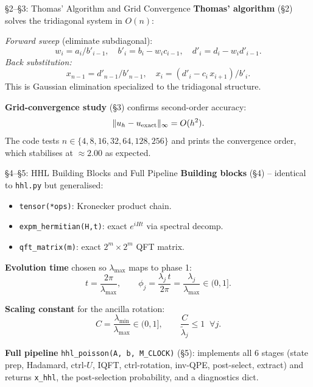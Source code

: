 \documentclass{beamer}
\begin{document}

\begin{frame}{\S2--\S3: Thomas' Algorithm and Grid Convergence}
\textbf{Thomas' algorithm} (\S2) solves the tridiagonal system in $O(n)$:

\medskip
\textit{Forward sweep} (eliminate subdiagonal):
\[
  w_i = a_i / b'_{i-1},\quad
  b'_i = b_i - w_i c_{i-1},\quad
  d'_i = d_i - w_i d'_{i-1}.
\]
\textit{Back substitution:}
\[
  x_{n-1} = d'_{n-1}/b'_{n-1},\quad
  x_i = (d'_i - c_i\,x_{i+1})/b'_i.
\]
This is Gaussian elimination specialized to the tridiagonal structure.

\medskip
\textbf{Grid-convergence study} (\S3) confirms second-order accuracy:
\[
  \|u_h - u_{\rm exact}\|_\infty = O(h^2).
\]
The code tests $n \in \{4,8,16,32,64,128,256\}$ and prints the
convergence order, which stabilises at $\approx 2.00$ as expected.
\end{frame}


\begin{frame}{\S4--\S5: HHL Building Blocks and Full Pipeline}
\textbf{Building blocks} (\S4) -- identical to \texttt{hhl.py} but generalised:
\begin{itemize}
  \item \texttt{tensor(*ops)}: Kronecker product chain.
  \item \texttt{expm\_hermitian(H,t)}: exact $e^{iHt}$ via spectral decomp.
  \item \texttt{qft\_matrix(m)}: exact $2^m\times 2^m$ QFT matrix.
\end{itemize}

\textbf{Evolution time} chosen so $\lambda_{\max}$ maps to phase 1:
\[
  t = \frac{2\pi}{\lambda_{\max}},
  \qquad
  \phi_j = \frac{\lambda_j\,t}{2\pi} = \frac{\lambda_j}{\lambda_{\max}} \in (0,1].
\]

\textbf{Scaling constant} for the ancilla rotation:
\[
  C = \frac{\lambda_{\min}}{\lambda_{\max}} \in (0,1],
  \qquad
  \frac{C}{\widetilde{\lambda}_j} \le 1 \;\;\forall j.
\]

\medskip
\textbf{Full pipeline} \texttt{hhl\_poisson(A, b, M\_CLOCK)} (\S5):
implements all 6 stages (state prep, Hadamard, ctrl-$U$, IQFT,
ctrl-rotation, inv-QPE, post-select, extract) and returns
\texttt{x\_hhl}, the post-selection probability, and a diagnostics dict.
\end{frame}
\end{document}
